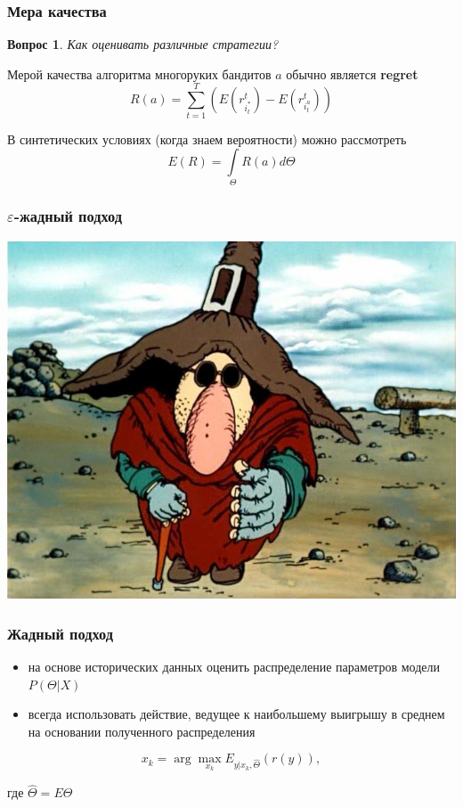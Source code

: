 \documentclass[fullscreen=true, bookmarks=true, hyperref={pdfencoding=unicode}]{beamer}
\newtheorem*{question}{Вопрос}
\begin{document}
\begin{frame}
  \frametitle{Мера качества}

  \begin{question}
    Как оценивать различные стратегии?
  \end{question}

  \pause
  Мерой качества алгоритма многоруких бандитов $a$ обычно является {\bf regret} $$ R(a) = \sum\limits_{t=1}^T \left(E(r_{i^*_t}^t) - E(r_{i^a_t}^t) \right)$$

  \vspace{1cm}
  В синтетических условиях (когда знаем вероятности) можно рассмотреть $$ E\left( R \right) = \int\limits_{\Theta} R(a)d\Theta$$
\end{frame}


\begin{frame}
  \frametitle{$\varepsilon$-жадный подход}

  \begin{center}
    \includegraphics[keepaspectratio,
                     width=.8\paperwidth]{greedy_billy.jpg}
  \end{center}
\end{frame}


\begin{frame}
  \frametitle{Жадный подход}

  \begin{itemize}
    \item на основе исторических данных оценить распределение параметров модели $P(\Theta|X)$
    \item всегда использовать действие, ведущее к наибольшему выигрышу в среднем на основании полученного распределения
  \end{itemize}

   $$ x_k = \arg\max\limits_{x_k} E_{y|x_k, \hat \Theta}\left( r(y)\right),$$

  где $\hat \Theta = E \Theta$
\end{frame}
\end{document}
